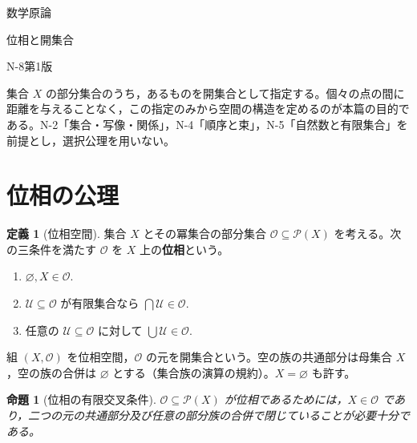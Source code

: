 \documentclass[a5paper,10pt,dvipdfmx]{jsarticle}
\theoremstyle{definition}
\newtheorem{defn}[ruledef]{定義}
\theoremstyle{plain}
\newtheorem{prop}[ruledef]{命題}
\newcommand{\Pow}{\mathcal{P}}
\newcommand{\GenronRefText}[2]{#2}
\begin{document}
\begin{center}
{\small 数学原論}\par\vspace{4mm}
{\LARGE 位相と開集合}\par\vspace{2mm}
{\small N-8\quad 第1版}
\end{center}
集合 $X$ の部分集合のうち，あるものを開集合として指定する。個々の点の間に距離を与えることなく，この指定のみから空間の構造を定めるのが本篇の目的である。N-2「集合・写像・関係」，N-4「順序と束」，N-5「自然数と有限集合」を前提とし，選択公理を用いない。
\section{位相の公理}
\begin{defn}[位相空間]\label{k146}
集合 $X$ とその冪集合の部分集合 $\mathcal{O}\subseteq\Pow(X)$ を考える。次の三条件を満たす $\mathcal{O}$ を $X$ 上の\textbf{位相}という。
\begin{enumerate}
\item $\varnothing,X\in\mathcal{O}$.
\item $\mathcal U\subseteq\mathcal{O}$ が有限集合なら $\bigcap\mathcal U\in\mathcal{O}$.
\item 任意の $\mathcal U\subseteq\mathcal{O}$ に対して $\bigcup\mathcal U\in\mathcal{O}$.
\end{enumerate}
組 $(X,\mathcal{O})$ を位相空間，$\mathcal{O}$ の元を開集合という。空の族の共通部分は母集合 $X$，空の族の合併は $\varnothing$ とする（\GenronRefText{K-000045}{集合族の演算の規約}）。$X=\varnothing$ も許す。
\end{defn}
\begin{prop}[位相の有限交叉条件]\label{k147}
$\mathcal{O}\subseteq\Pow(X)$ が位相であるためには，$X\in\mathcal{O}$ であり，二つの元の共通部分及び任意の部分族の合併で閉じていることが必要十分である。
\end{prop}
\end{document}
